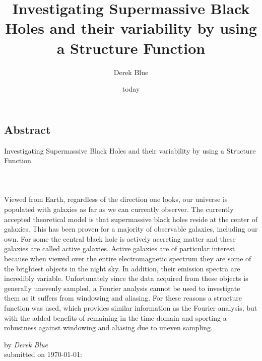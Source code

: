 \documentclass[12pt, oneside]{smuthesis}
\newcommand{\myTitle}{Investigating Supermassive Black Holes and their variability by using a Structure Function}
\begin{document}
\frontmatter
\title{\sc \myTitle}
\author{Derek Blue}
\date{today}
\medskip

\maketitle
\pagestyle{headings}

\begin{center}
\section*{\center \sc Abstract} \label{abstract}
\sc \myTitle
\paragraph*{\center  \\}
\end{center}
Viewed from Earth, regardless of the direction one looks, our universe is populated with galaxies as far as we can currently observer. The currently accepted theoretical model is that supermassive black holes reside at the center of galaxies. This has been proven for a majority of observable galaxies, including our own. For some the central black hole is actively accreting matter and these galaxies are called active galaxies. Active galaxies are of particular interest because when viewed over the entire electromagnetic spectrum they are some of the brightest objects in the night sky. In addition, their emission spectra are incredibly variable. Unfortunately since the data acquired from these objects is generally unevenly sampled, a Fourier analysis cannot be used to investigate them as it suffers from windowing and aliasing. For these reasons a structure function was used, which provides similar information as the Fourier analysis, but with the added benefits of remaining in the time domain and sporting a robustness against windowing and aliasing due to uneven sampling.

\begin{center}
by {\em Derek Blue}\\
submitted on \today:\\
\end{center}
\newpage

\tableofcontents
\listoffigures
\listoftables
\newpage
%
\mainmatter
\end{document}

